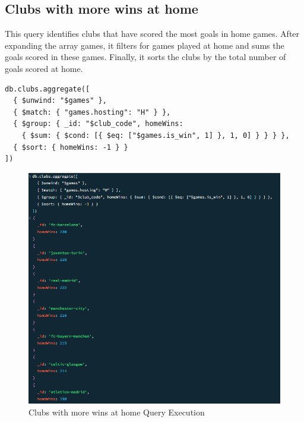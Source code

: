 \documentclass{Configuration_Files/PoliMi3i_thesis}
\begin{document}
\subsection{Clubs with more wins at home}
This query identifies clubs that have scored the most goals in home games. After expanding the array games, it filters for games played at home and sums the goals scored in these games. Finally, it sorts the clubs by the total number of goals scored at home.
\begin{verbatim}
db.clubs.aggregate([
  { $unwind: "$games" },
  { $match: { "games.hosting": "H" } },
  { $group: { _id: "$club_code", homeWins: 
    { $sum: { $cond: [{ $eq: ["$games.is_win", 1] }, 1, 0] } } } },
  { $sort: { homeWins: -1 } }
])
\end{verbatim}
\begin{figure}[htbp]
    \centering
    \includegraphics[scale=0.9]{Images/Queries/Clubs/more_wins_at_home/mwat.png}
    \caption{Clubs with more wins at home Query Execution}
\end{figure}


\cleardoublepage
{} %
\appendix
\end{document}
